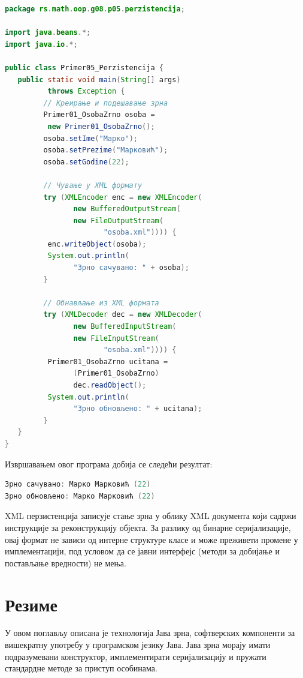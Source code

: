 \begin{lstlisting}[language=Java]
package rs.math.oop.g08.p05.perzistencija;
 
import java.beans.*;
import java.io.*;
 
public class Primer05_Perzistencija {
   public static void main(String[] args)
          throws Exception {
         // Креирање и подешавање зрна
         Primer01_OsobaZrno osoba =
          new Primer01_OsobaZrno();
         osoba.setIme("Марко");
         osoba.setPrezime("Марковић");
         osoba.setGodine(22);
 
         // Чување у XML формату
         try (XMLEncoder enc = new XMLEncoder(
                new BufferedOutputStream(
                new FileOutputStream(
                       "osoba.xml")))) {
          enc.writeObject(osoba);
          System.out.println(
                "Зрно сачувано: " + osoba);
         }
 
         // Обнављање из XML формата
         try (XMLDecoder dec = new XMLDecoder(
                new BufferedInputStream(
                new FileInputStream(
                       "osoba.xml")))) {
          Primer01_OsobaZrno ucitana =
                (Primer01_OsobaZrno)
                dec.readObject();
          System.out.println(
                "Зрно обновљено: " + ucitana);
         }
   }
}
\end{lstlisting}


Извршавањем овог програма добија се следећи резултат:


\begin{lstlisting}[language=Java]
Зрно сачувано: Марко Марковић (22)
Зрно обновљено: Марко Марковић (22)
\end{lstlisting}


XML перзистенција записује стање зрна у облику XML документа који садржи инструкције за реконструкцију објекта. За разлику од бинарне серијализације, овај формат не зависи од интерне структуре класе и може преживети промене у имплементацији, под условом да се јавни интерфејс (методи за добијање и постављање вредности) не мења.


\section{Резиме}

У овом поглављу описана је технологија Јава зрна, софтверских компоненти за вишекратну употребу у програмском језику Јава. Јава зрна морају имати подразумевани конструктор, имплементирати серијализацију и пружати стандардне методе за приступ особинама.

